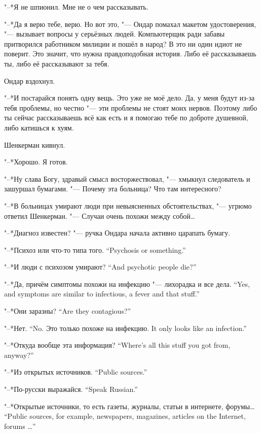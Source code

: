"--*Я не шпионил.
Мне не о чем рассказывать.

"--*Да я верю тебе, верю.
Но вот это, "--- Ондар помахал макетом удостоверения, "--- вызывает вопросы у серьёзных людей.
Компьютерщик ради забавы притворился работником милиции и пошёл в народ?
В это ни один идиот не поверит.
Это значит, что нужна правдоподобная история.
Либо её рассказываешь ты, либо её рассказывают за тебя.

Ондар вздохнул.

"--*И постарайся понять одну вещь.
Это уже не моё дело.
Да, у меня будут из-за тебя проблемы, но честно "--- эти проблемы не стоят моих нервов.
Поэтому либо ты сейчас рассказываешь всё как есть и я помогаю тебе по доброте душевной, либо катишься к хуям.

Шенкерман кивнул.

"--*Хорошо.
Я готов.

"--*Ну слава Богу, здравый смысл восторжествовал, "--- хмыкнул следователь и зашуршал бумагами.
"--- Почему эта больница?
Что там интересного?

"--*В больницах умирают люди при невыясненных обстоятельствах, "--- угрюмо ответил Шенкерман.
"--- Случаи очень похожи между собой\ldots{}

"--*Диагноз известен? "--- ручка Ондара начала активно царапать бумагу.

{"--*Психоз или что-то типа того.}
{``Psychosis or something.''}

{"--*И люди с психозом умирают?}
{``And psychotic people die?''}

{"--*Да, причём симптомы похожи на инфекцию "--- лихорадка и все дела.}
{``Yes, and symptoms are similar to infectious, a fever and that stuff.''}

{"--*Они заразны?}
{``Are they contagious?''}

{"--*Нет.}
{``No.}
{Это только похоже на инфекцию.}
{It only looks like an infection.''}

{"--*Откуда вообще эта информация?}
{``Where's all this stuff you got from, anyway?''}

{"--*Из открытых источников.}
{``Public sources.''}

{"--*По-русски выражайся.}
{``Speak Russian.''}

{"--*Открытые источники, то есть газеты, журналы, статьи в интернете, форумы\ldots{}}
{``Public sources, for example, newspapers, magazines, articles on the Internet, forums \ldots{}''}

